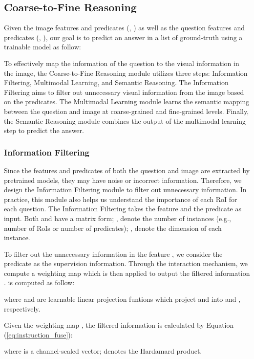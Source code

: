 \documentclass[10pt,twocolumn,letterpaper]{article}
\begin{document}
\subsection{Coarse-to-Fine Reasoning}
\label{sec:FFOE_vQA}

Given the image features and predicates (,  ) as well as the question features and predicates (,  ), our goal is to predict an answer  in a list of ground-truth  using a trainable model  as follow:


To effectively map the information of the question to the visual information in the image, the Coarse-to-Fine Reasoning module utilizes three steps: Information Filtering, Multimodal Learning, and Semantic Reasoning. The  Information Filtering aims to filter out unnecessary visual information from the image based on the predicates. The Multimodal Learning module learns the semantic mapping between the question and image at coarse-grained and fine-grained levels. Finally, the Semantic Reasoning module combines the output of the multimodal learning step to predict the answer.


\subsubsection{Information Filtering}
\label{subsec:Instruc_Guiding}
Since the features and predicates of both the question and image are extracted by pretrained models, they may have noise or incorrect information. Therefore, we design the Information Filtering module to filter out unnecessary information. In practice, this module also helps us understand the importance of each RoI for each question. The Information Filtering takes the feature  and the predicate  as input.
Both  and  have a matrix form; ,  denote the number of instances (e.g., number of RoIs or number of predicates); ,  denote the dimension of each instance. 

To filter out the unnecessary information in the feature , we consider the predicate  as the supervision information. Through the interaction mechanism, we compute a weighting map  which is then applied to output the filtered information .  is computed as follow:


where  and  are learnable linear projection funtions which project  and   into    and  , respectively. 


Given the weighting map , the filtered information  is calculated by Equation (\ref{eq:instruction_fuse}):


where  is a channel-scaled vector;  denotes the Hardamard product.
\end{document}
